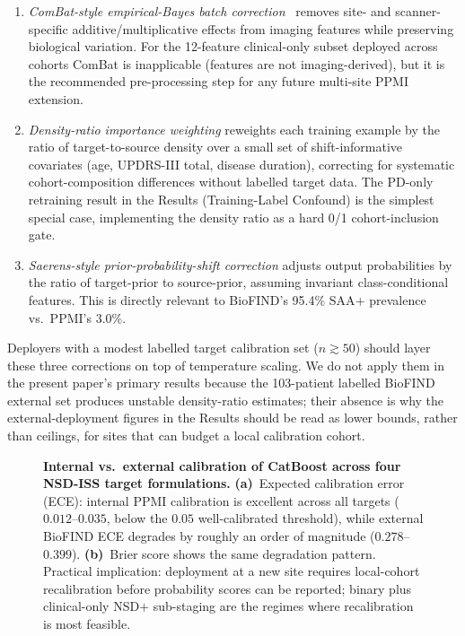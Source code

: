 \documentclass[10pt,letterpaper]{article}
\begin{document}
\begin{enumerate}[label=(\roman*),leftmargin=*,itemsep=2pt,topsep=3pt]
\item \textit{ComBat-style empirical-Bayes batch correction}~\cite{wakasugi2024combat} removes site- and scanner-specific additive/multiplicative effects from imaging features while preserving biological variation. For the 12-feature clinical-only subset deployed across cohorts ComBat is inapplicable (features are not imaging-derived), but it is the recommended pre-processing step for any future multi-site PPMI extension.
\item \textit{Density-ratio importance weighting} reweights each training example by the ratio of target-to-source density over a small set of shift-informative covariates (age, UPDRS-III total, disease duration), correcting for systematic cohort-composition differences without labelled target data. The PD-only retraining result in the Results (Training-Label Confound) is the simplest special case, implementing the density ratio as a hard 0/1 cohort-inclusion gate.
\item \textit{Saerens-style prior-probability-shift correction} adjusts output probabilities by the ratio of target-prior to source-prior, assuming invariant class-conditional features. This is directly relevant to BioFIND's 95.4\% SAA$+$ prevalence vs.\ PPMI's 3.0\%.
\end{enumerate}

Deployers with a modest labelled target calibration set ($n \gtrsim 50$) should layer these three corrections on top of temperature scaling. We do not apply them in the present paper's primary results because the 103-patient labelled BioFIND external set produces unstable density-ratio estimates; their absence is why the external-deployment figures in the Results should be read as lower bounds, rather than ceilings, for sites that can budget a local calibration cohort.

\begin{figure}[!t]

\caption{\textbf{Internal vs.\ external calibration of CatBoost across four NSD-ISS target formulations.} \textbf{(a)}~Expected calibration error (ECE): internal PPMI calibration is excellent across all targets ($0.012$--$0.035$, below the $0.05$ well-calibrated threshold), while external BioFIND ECE degrades by roughly an order of magnitude ($0.278$--$0.399$). \textbf{(b)}~Brier score shows the same degradation pattern. Practical implication: deployment at a new site requires local-cohort recalibration before probability scores can be reported; binary plus clinical-only NSD$+$ sub-staging are the regimes where recalibration is most feasible.}
\label{p1:fig:calibration}
\end{figure}
\end{document}
